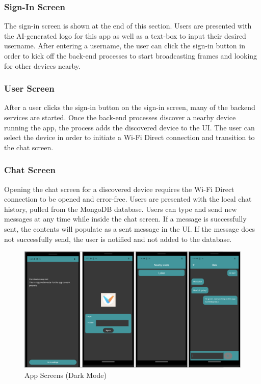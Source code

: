 \documentclass[10pt]{article}
\begin{document}
\subsubsection{Sign-In Screen}

The sign-in screen is shown at the end of this section. Users are presented with the AI-generated logo for this app as well as a text-box to input their desired username. After entering a username, the user can click the sign-in button in order to kick off the back-end processes to start broadcasting frames and looking for other devices nearby.

\subsubsection{User Screen}

After a user clicks the sign-in button on the sign-in screen, many of the backend services are started. Once the back-end processes discover a nearby device running the app, the process adds the discovered device to the UI. The user can select the device in order to initiate a Wi-Fi Direct connection and transition to the chat screen.

\subsubsection{Chat Screen}

Opening the chat screen for a discovered device requires the Wi-Fi Direct connection to be opened and error-free. Users are presented with the local chat history, pulled from the MongoDB database. Users can type and send new messages at any time while inside the chat screen. If a message is successfully sent, the contents will populate as a sent message in the UI. If the message does not successfully send, the user is notified and not added to the database.

\begin{figure}[h]
    \centering
    \includegraphics[width=6.5in]{screens.png}
    \caption{App Screens (Dark Mode)}
    \label{frontend:screens}
\end{figure}
\end{document}
